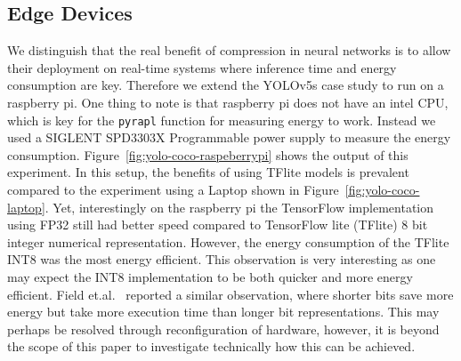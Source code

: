 \subsection{Edge Devices}
We distinguish that the real benefit of compression in neural networks is to allow their deployment on real-time systems where inference time and energy consumption are key. Therefore we extend the YOLOv5s case study to run on a raspberry pi.
%
One thing to note is that raspberry pi does not have an intel CPU, which is key for the {\tt pyrapl} function for measuring energy to work. Instead we used a SIGLENT SPD3303X Programmable power supply to measure the energy consumption. 
%
Figure~\ref{fig:yolo-coco-raspeberrypi} shows the output of this experiment.
%
In this setup, the benefits of using TFlite models is prevalent compared to the experiment using a Laptop shown in Figure~\ref{fig:yolo-coco-laptop}.
%
Yet, interestingly on the raspberry pi the TensorFlow implementation using FP32 still had better speed compared to TensorFlow lite (TFlite) 8 bit integer numerical representation. 
%
However, the energy consumption of the TFlite INT8 was the most energy efficient. This observation is very interesting as one may expect the INT8 implementation to be both quicker and more energy efficient. 
%
Field et.al.~\cite{Field2014} reported a similar observation, where shorter bits save more energy but take more execution time than longer bit representations. 
%
This may perhaps be resolved through reconfiguration of hardware, however, it is beyond the scope of this paper to investigate technically how this can be achieved.







